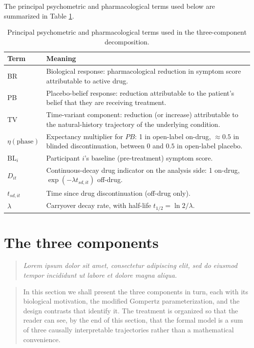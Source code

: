 \documentclass[
  11pt,
]{article}
\newenvironment{rgt}{%
  \begin{quote}\small\itshape\color[RGB]{20,60,160}}{%
  \end{quote}}
\newenvironment{orig}{%
  \begin{quote}\normalsize\color[gray]{0.55}}{%
  \end{quote}}
\begin{document}
The principal psychometric and pharmacological terms used below
are summarized in Table \ref{tab:terms}.

\begin{table}

\caption{\label{tab:terms}Principal psychometric and pharmacological terms used in the three-component decomposition.}
\centering
\begin{tabular}[t]{ll}
\toprule
Term & Meaning\\
\midrule
BR & Biological response: pharmacological reduction in symptom score attributable to active drug.\\
PB & Placebo-belief response: reduction attributable to the patient's belief that they are receiving treatment.\\
TV & Time-variant component: reduction (or increase) attributable to the natural-history trajectory of the underlying condition.\\
$\eta(\text{phase})$ & Expectancy multiplier for $PB$: 1 in open-label on-drug, $\approx 0.5$ in blinded discontinuation, between $0$ and $0.5$ in open-label placebo.\\
$\mathrm{BL}_i$ & Participant $i$'s baseline (pre-treatment) symptom score.\\
\addlinespace
$D_{it}$ & Continuous-decay drug indicator on the analysis side: 1 on-drug, $\exp(-\lambda t_{sd,it})$ off-drug.\\
$t_{sd,it}$ & Time since drug discontinuation (off-drug only).\\
$\lambda$ & Carryover decay rate, with half-life $t_{1/2} = \ln 2 / \lambda$.\\
\bottomrule
\end{tabular}
\end{table}

\section{The three components}\label{the-three-components}

\begin{rgt}
Lorem ipsum dolor sit amet, consectetur adipiscing elit, sed do eiusmod tempor incididunt ut labore et dolore magna aliqua.

\end{rgt}

\begin{orig}
In this section we shall present the three components in turn,
each with its biological motivation, the modified Gompertz
parameterization, and the design contrasts that identify it.
The treatment is organized so that the reader can see, by the
end of this section, that the formal model is a sum of three
causally interpretable trajectories rather than a mathematical
convenience.

\end{orig}
\end{document}

